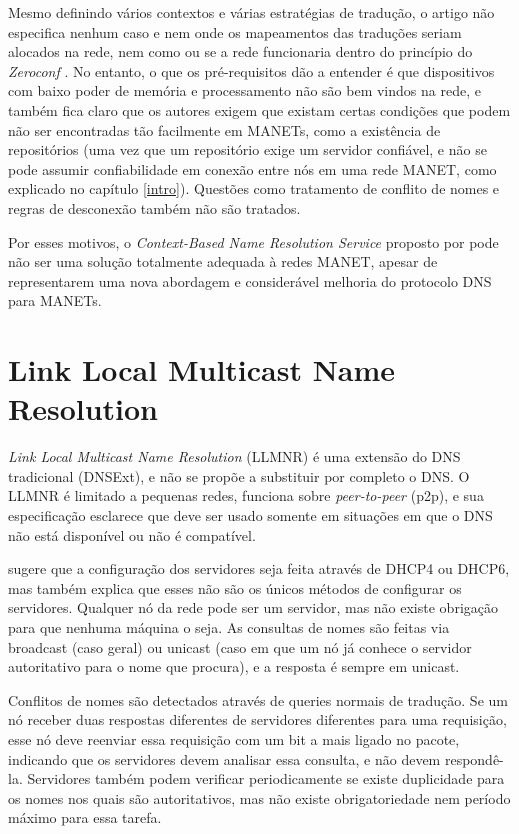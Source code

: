     Mesmo definindo vários contextos e várias estratégias de tradução, o artigo
    não especifica nenhum caso e nem onde os mapeamentos das traduções seriam
    alocados na rede, nem como ou se a rede funcionaria dentro do princípio do
    \textit{Zeroconf} \cite{zeroconf}. No entanto, o que os pré-requisitos dão
    a entender é que dispositivos com baixo poder de memória e processamento
    não são bem vindos na rede, e também fica claro que os autores exigem que
    existam certas condições que podem não ser encontradas tão facilmente em
    MANETs, como a existência de repositórios (uma vez que um repositório exige
    um servidor confiável, e não se pode assumir confiabilidade em conexão entre
    nós em uma rede MANET, como explicado no capítulo \ref{intro}). Questões como
    tratamento de conflito de nomes e regras de desconexão também não são tratados.
    
    Por esses motivos, o \textit{Context-Based Name Resolution Service} proposto
    por \cite{context-dns} pode não ser uma solução totalmente adequada à
    redes MANET, apesar de representarem uma nova abordagem e considerável melhoria
    do protocolo DNS \cite{rfc1035} para MANETs.

\section{Link Local Multicast Name Resolution}

    \textit{Link Local Multicast Name Resolution} (LLMNR) \cite{llmnr} é uma
    extensão do DNS tradicional (DNSExt), e não se propõe a substituir por
    completo o DNS. O LLMNR é limitado a pequenas redes, funciona sobre
    \textit{peer-to-peer} (p2p), e sua especificação esclarece que deve ser usado
    somente em situações em que o DNS não está disponível ou não é compatível.
    
    \cite{llmnr} sugere que a configuração dos servidores seja feita através de
    DHCP4 ou DHCP6, mas também explica que esses não são os únicos métodos de
    configurar os servidores. Qualquer nó da rede pode ser um servidor, mas não
    existe obrigação para que nenhuma máquina o seja. As consultas de nomes são
    feitas via broadcast (caso geral) ou unicast (caso em que um nó já conhece o
    servidor autoritativo para o nome que procura), e a resposta é sempre em unicast.
    
    Conflitos de nomes são detectados através de queries normais de tradução. Se
    um nó receber duas respostas diferentes de servidores diferentes para uma
    requisição, esse nó deve reenviar essa requisição com um bit a mais ligado
    no pacote, indicando que os servidores devem analisar essa consulta, e não
    devem respondê-la. Servidores também podem verificar periodicamente se existe
    duplicidade para os nomes nos quais são autoritativos, mas não existe
    obrigatoriedade nem período máximo para essa tarefa.
    
